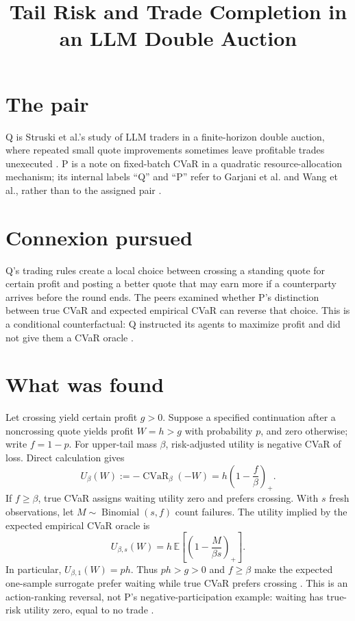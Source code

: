 \documentclass{article}
\title{Tail Risk and Trade Completion in an LLM Double Auction}
\begin{document}
\maketitle

\section{The pair}

Q is Struski et al.'s study of LLM traders in a finite-horizon double auction, where repeated small quote improvements sometimes leave profitable trades unexecuted . P is a note on fixed-batch CVaR in a quadratic resource-allocation mechanism; its internal labels ``Q'' and ``P'' refer to Garjani et al. and Wang et al., rather than to the assigned pair .

\section{Connexion pursued}

Q's trading rules create a local choice between crossing a standing quote for certain profit and posting a better quote that may earn more if a counterparty arrives before the round ends. The peers examined whether P's distinction between true CVaR and expected empirical CVaR can reverse that choice. This is a conditional counterfactual: Q instructed its agents to maximize profit and did not give them a CVaR oracle .

\section{What was found}

Let crossing yield certain profit \(g>0\). Suppose a specified continuation after a noncrossing quote yields profit \(W=h>g\) with probability \(p\), and zero otherwise; write \(f=1-p\). For upper-tail mass \(\beta\), risk-adjusted utility is negative CVaR of loss. Direct calculation gives
\[
 U_\beta(W):=-\operatorname{CVaR}_\beta(-W)
 =h\left(1-\frac{f}{\beta}\right)_+.
\]
If \(f\geq\beta\), true CVaR assigns waiting utility zero and prefers crossing. With \(s\) fresh observations, let \(M\sim\operatorname{Binomial}(s,f)\) count failures. The utility implied by the expected empirical CVaR oracle is
\[
 U_{\beta,s}(W)
 =h\,\mathbb{E}\left[
   \left(1-\frac{M}{\beta s}\right)_+
 \right].
\]
In particular, \(U_{\beta,1}(W)=ph\). Thus \(ph>g>0\) and \(f\geq\beta\) make the expected one-sample surrogate prefer waiting while true CVaR prefers crossing . This is an action-ranking reversal, not P's negative-participation example: waiting has true-risk utility zero, equal to no trade .
\end{document}
